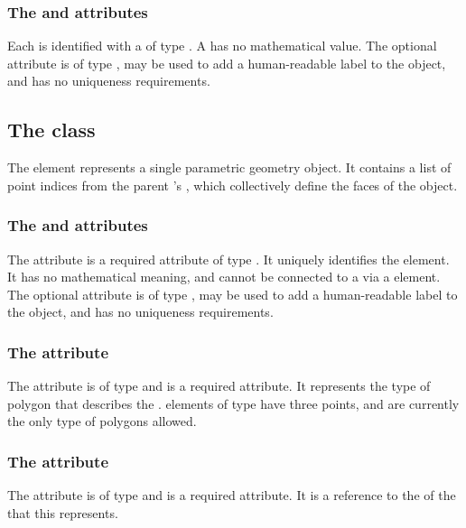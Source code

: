 \subsubsection{The \fixttspace{} and \fixttspace{} attributes}
Each \SpatialPoints is identified with a  of type .  A \SpatialPoints has no mathematical value.  The optional  attribute is of type , may be used to add a human-readable label to the object, and has no uniqueness requirements.


\subsection{The  class}
\label{parametricobject-class}
The \ParametricObject element represents a single parametric geometry object.  It contains a list of point indices from the parent \ParametricGeometry's \SpatialPoints, which collectively define the faces of the object.

\subsubsection{The \fixttspace{} and \fixttspace{} attributes}
The  attribute is a required attribute of type . It uniquely identifies the \ParametricObject element.  It has no mathematical meaning, and cannot be connected to a \Parameter via a \SpatialSymbolReference element.  The optional  attribute is of type , may be used to add a human-readable label to the object, and has no uniqueness requirements.

\subsubsection{The \fixttspace{} attribute}
The  attribute is of type  and is a required attribute. It represents the type of polygon that describes the \ParametricObject.  \ParametricObject elements of type  have three points, and are currently the only type of polygons allowed.

\subsubsection{The \fixttspace{} attribute}
The  attribute is of type  and is a required attribute. It is a reference to the  of the \DomainType that this \ParametricObject represents.

